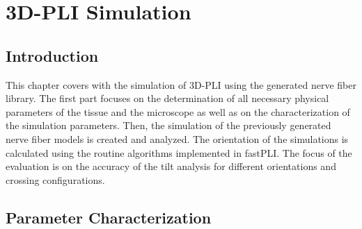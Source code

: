 \cleardoublepage
\setcounter{chapter}{8}
\chapter{\acs{3D-PLI} Simulation}
\label{cha:simulation_analysis}
%
\section{Introduction}
%
This chapter covers with the simulation of \ac{3D-PLI} using the generated nerve fiber library.
The first part focuses on the determination of all necessary physical parameters of the tissue and the microscope as well as on the characterization of the simulation parameters.
Then, the simulation of the previously generated nerve fiber models is created and analyzed.
The orientation of the simulations is calculated using the routine algorithms implemented in \ac{fastPLI}.
The focus of the evaluation is on the accuracy of the tilt analysis for different orientations and crossing configurations.
%
%
%
\section{Parameter Characterization}\label{sec:sim_choose_parameters}
%
